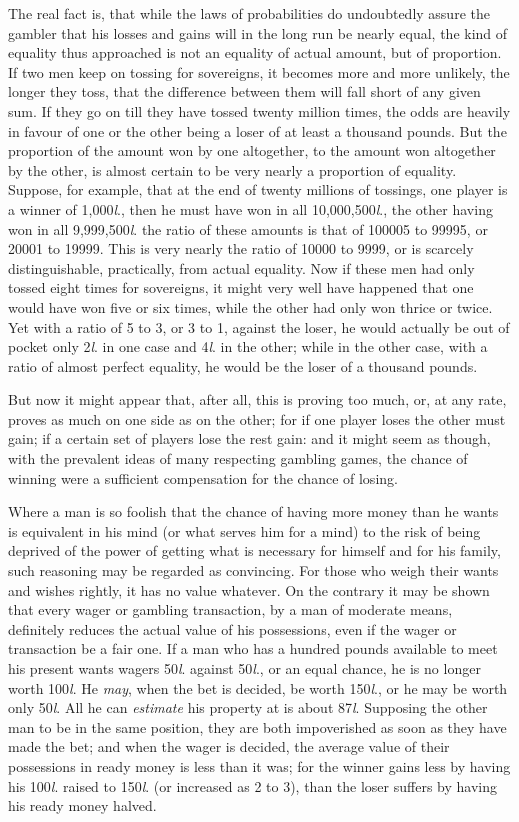 \documentclass[letterpaper,12pt,oneside,openany]{memoir}
\begin{document}
The real fact is, that while the laws of probabilities
do undoubtedly assure the gambler that his losses and
gains will in the long run be nearly equal, the kind of
equality thus approached is not an equality of actual
amount, but of proportion. If two men keep on tossing
for sovereigns, it becomes more and more unlikely,
the longer they toss, that the difference between them
will fall short of any given sum. If they go on till
they have tossed twenty million times, the odds are
heavily in favour of one or the other being a loser of at
least a thousand pounds. But the proportion of the
amount won by one altogether, to the amount won altogether
by the other, is almost certain to be very nearly
a proportion of equality. Suppose, for example, that at
the end of twenty millions of tossings, one player is a
winner of 1,000\textit{l}., then he must have won in all
10,000,500\textit{l}., the other having won in all 9,999,500\textit{l}.
the ratio of these amounts is that of 100005 to 99995,
or 20001 to 19999. This is very nearly the ratio of
10000 to 9999, or is scarcely distinguishable, practically,
from actual equality. Now if these men had only
tossed eight times for sovereigns, it might very well
have happened that one would have won five or six
times, while the other had only won thrice or twice.
Yet with a ratio of 5 to 3, or 3 to 1, against the loser,
he would actually be out of pocket only 2\textit{l}. in one case
and 4\textit{l}. in the other; while in the other case, with a
ratio of almost perfect equality, he would be the loser
of a thousand pounds.

But now it might appear that, after all, this is
proving too much, or, at any rate, proves as much on
one side as on the other; for if one player loses the
other must gain; if a certain set of players lose the
rest gain: and it might seem as though, with the prevalent
ideas of many respecting gambling games, the
chance of winning were a sufficient compensation for
the chance of losing.

Where a man is so foolish that the chance of having
more money than he wants is equivalent in his mind
(or what serves him for a mind) to the risk of being
deprived of the power of getting what is necessary for
himself and for his family, such reasoning may be
regarded as convincing. For those who weigh their
wants and wishes rightly, it has no value whatever.
On the contrary it may be shown that every wager or
gambling transaction, by a man of moderate means,
definitely reduces the actual value of his possessions,
even if the wager or transaction be a fair one. If a
man who has a hundred pounds available to meet his
present wants wagers 50\textit{l}. against 50\textit{l}., or an equal
chance, he is no longer worth 100\textit{l}. He \textit{may}, when
the bet is decided, be worth 150\textit{l}., or he may be worth
only 50\textit{l}. All he can \textit{estimate} his property at is about
87\textit{l}. Supposing the other man to be in the same position,
they are both impoverished as soon as they have
made the bet; and when the wager is decided, the
average value of their possessions in ready money is less
than it was; for the winner gains less by having his
100\textit{l}. raised to 150\textit{l}. (or increased as 2 to 3), than the
loser suffers by having his ready money halved.
\end{document}
